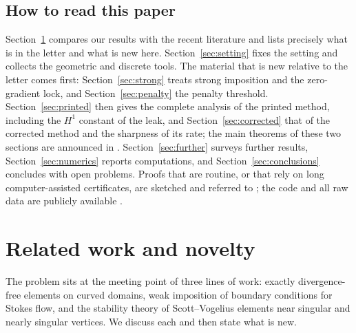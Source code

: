 \documentclass[pdflatex,sn-mathphys-num]{sn-jnl}
\theoremstyle{thmstyleone}
\theoremstyle{thmstylethree}
\begin{document}
\subsection{How to read this paper}
Section~\ref{sec:related} compares our results with the recent literature and lists precisely what is in the letter \cite{CavalcantePadhiLetter} and what is new here. Section~\ref{sec:setting} fixes the setting and collects the geometric and discrete tools. The material that is new relative to the letter comes first: Section~\ref{sec:strong} treats strong imposition and the zero-gradient lock, and Section~\ref{sec:penalty} the penalty threshold. Section~\ref{sec:printed} then gives the complete analysis of the printed method, including the $H^1$ constant of the leak, and Section~\ref{sec:corrected} that of the corrected method and the sharpness of its rate; the main theorems of these two sections are announced in \cite{CavalcantePadhiLetter}. Section~\ref{sec:further} surveys further results, Section~\ref{sec:numerics} reports computations, and Section~\ref{sec:conclusions} concludes with open problems. Proofs that are routine, or that rely on long computer-assisted certificates, are sketched and referred to \cite{PadhiExt}; the code and all raw data are publicly available \cite{ZeroGradRepo}.

\section{Related work and novelty}\label{sec:related}

The problem sits at the meeting point of three lines of work: exactly divergence-free elements on curved domains, weak imposition of boundary conditions for Stokes flow, and the stability theory of Scott--Vogelius elements near singular and nearly singular vertices. We discuss each and then state what is new.
\end{document}
